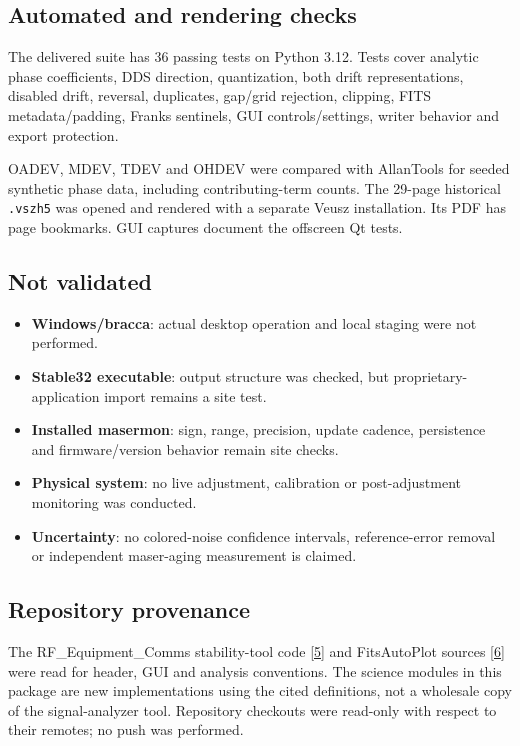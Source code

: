 \documentclass[11pt,a4paper]{article}
\begin{document}
\subsection{Automated and rendering checks}
The delivered suite has 36 passing tests on Python 3.12. Tests cover analytic
phase coefficients, DDS direction, quantization, both drift representations,
disabled drift, reversal, duplicates, gap/grid rejection, clipping, FITS
metadata/padding, Franks sentinels, GUI controls/settings, writer behavior and
export protection.

OADEV, MDEV, TDEV and OHDEV were compared with AllanTools for seeded synthetic
phase data, including contributing-term counts. The 29-page historical
\texttt{.vszh5} was opened and rendered with a separate Veusz installation.
Its PDF has page bookmarks. GUI captures document the offscreen Qt tests.

\subsection{Not validated}
\begin{itemize}
\item \textbf{Windows/bracca}: actual desktop operation and local staging were not performed.
\item \textbf{Stable32 executable}: output structure was checked, but proprietary-application import remains a site test.
\item \textbf{Installed masermon}: sign, range, precision, update cadence, persistence and firmware/version behavior remain site checks.
\item \textbf{Physical system}: no live adjustment, calibration or post-adjustment monitoring was conducted.
\item \textbf{Uncertainty}: no colored-noise confidence intervals, reference-error removal or independent maser-aging measurement is claimed.
\end{itemize}

\subsection{Repository provenance}
The RF\_Equipment\_Comms stability-tool code
\href{https://github.com/Braveheart53/RF_Equipment_Comms/tree/main/sa_stability_tool}{[5]}
and FitsAutoPlot sources \href{https://github.com/Braveheart53/FitsAutoPlot}{[6]}
were read for header, GUI and analysis conventions. The science modules in this package
are new implementations using the cited definitions, not a wholesale copy of
the signal-analyzer tool. Repository checkouts were read-only with respect
to their remotes; no push was performed.
\end{document}

